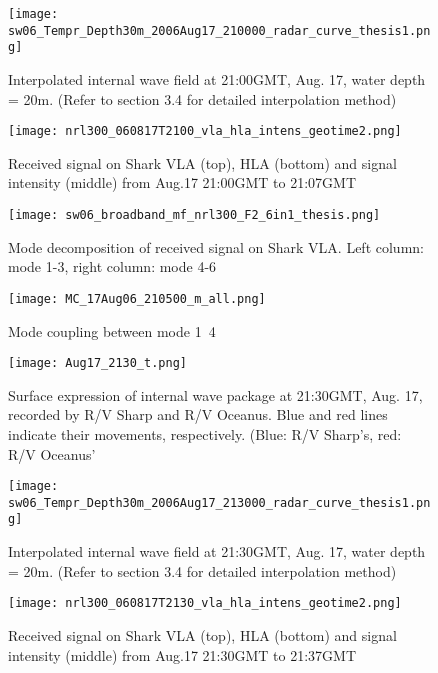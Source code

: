 \begin{figure}[H]
  \centering
  \texttt{[image: sw06\_Tempr\_Depth30m\_2006Aug17\_210000\_radar\_curve\_thesis1.png]}
  \caption{Interpolated internal wave field at 21:00GMT, Aug. 17, water depth = 20m. (Refer to section 3.4 for detailed interpolation method)}\label{fig:r2100_i}
\end{figure}

\begin{figure}[H]
  \centering
  \texttt{[image: nrl300\_060817T2100\_vla\_hla\_intens\_geotime2.png]}
  \caption{Received signal on Shark VLA (top), HLA (bottom) and signal intensity (middle) from Aug.17 21:00GMT to 21:07GMT }\label{fig:a2100}
\end{figure}

\begin{figure}[H]
  \centering
  \texttt{[image: sw06\_broadband\_mf\_nrl300\_F2\_6in1\_thesis.png]}
  \caption{Mode decomposition of received signal on Shark VLA. 
    Left column: mode 1-3, right column: mode 4-6 }\label{fig:m2100}
\end{figure}


\begin{figure}[H]
  \centering
  \texttt{[image: MC\_17Aug06\_210500\_m\_all.png]}
  \caption{Mode coupling between mode 1~4 }\label{fig:mc2130}
\end{figure}


\begin{figure}[H]
  \centering
  \texttt{[image: Aug17\_2130\_t.png]}
  \caption{Surface expression of internal wave package at 21:30GMT, Aug. 17, recorded by R/V Sharp and R/V Oceanus. Blue and red lines indicate their movements, respectively. (Blue: R/V Sharp's, red: R/V Oceanus'}\label{fig:r2130_r}
\end{figure}

\begin{figure}[H]
  \centering
  \texttt{[image: sw06\_Tempr\_Depth30m\_2006Aug17\_213000\_radar\_curve\_thesis1.png]}
  \caption{Interpolated internal wave field at 21:30GMT, Aug. 17, water depth = 20m. (Refer to section 3.4 for detailed interpolation method)}\label{fig:r2130_i}
\end{figure}

\begin{figure}[H]
  \centering
  \texttt{[image: nrl300\_060817T2130\_vla\_hla\_intens\_geotime2.png]}
  \caption{Received signal on Shark VLA (top), HLA (bottom) and signal intensity (middle) from Aug.17 21:30GMT to 21:37GMT }\label{fig:a2130}
\end{figure}

